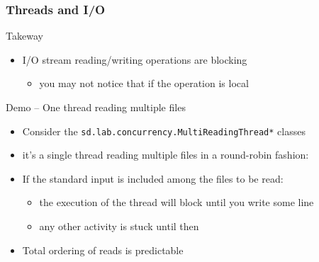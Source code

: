 \documentclass[presentation]{beamer}\mode<presentation>{\usetheme{AMSBolognaFC}}
\begin{document}
\begin{frame}[allowframebreaks]
    \frametitle{Threads and I/O}

    \begin{alertblock}{Takeway}
        \begin{itemize}
            \item I/O stream reading/writing operations are \alert{blocking}
            \begin{itemize}
                \item you may not notice that if the operation is \alert{local}
            \end{itemize}
        \end{itemize}
    \end{alertblock}

    \framebreak

    \startDemo
    \begin{exampleblock}{Demo \currentDemo{} -- One thread reading multiple files}
        \begin{itemize}
            \item Consider the \texttt{sd.lab.concurrency.\alert{MultiReadingThread}*} classes
            \item it's a single thread reading multiple files in a \alert{round-robin} fashion:
            \item If the standard input is included among the files to be read:
            \begin{itemize}
                \item the execution of the thread will block until you write some line
                \item any other activity is stuck until then
            \end{itemize}
            \item Total ordering of reads is \alert{predictable}
        \end{itemize}
    \end{exampleblock}


\end{frame}
\end{document}

